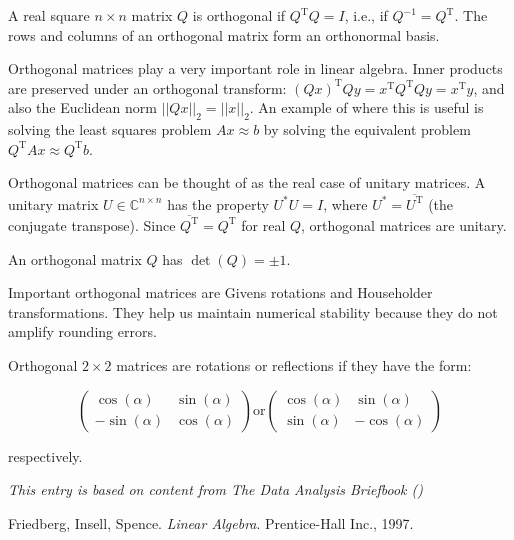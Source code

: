 \documentclass[12pt]{article}
\newcommand{\trT}{{\mathrm T}}
\begin{document}
A real square $n \times n$ matrix $Q$ is orthogonal if $Q^\trT Q = I$, i.e., if $Q^{-1} = Q^\trT$.  The rows and columns of an orthogonal matrix form an orthonormal basis.

Orthogonal matrices play a very important role in linear algebra.  Inner products are preserved under an orthogonal transform: $(Qx)^\trT Qy=x^\trT Q^\trT Qy=x^\trT y$, and also the Euclidean norm $||Qx||_2 = ||x||_2$.  An example of where this is useful is solving the least squares problem $Ax \approx b$ by solving the equivalent problem $Q^\trT Ax \approx Q^\trT b$.

Orthogonal matrices can be thought of as the real case of unitary matrices.  A unitary matrix $U \in \mathbb{C}^{n \times n}$ has the property $U^*U = I$, where $U^* = \overline{U^\trT}$ (the conjugate transpose).  Since $\overline{Q^\trT} = Q^\trT$ for real $Q$, orthogonal matrices are unitary.

An orthogonal matrix $Q$ has $\det(Q) = \pm 1$.

Important orthogonal matrices are Givens rotations and Householder transformations.  They help us maintain numerical stability because they do not amplify rounding errors.

Orthogonal $2 \times 2$ matrices are rotations or reflections if they have the form:

$$ \begin{pmatrix} \cos(\alpha) & \sin(\alpha) \\ -\sin(\alpha) & \cos(\alpha) \end{pmatrix}  \text{or} \begin{pmatrix} \cos(\alpha) & \sin(\alpha) \\ \sin(\alpha) & -\cos(\alpha) \end{pmatrix} $$

respectively.

{\it This entry is based on content from The Data Analysis Briefbook ()}
\begin{thebibliography}{3}

 Friedberg, Insell, Spence. {\it Linear Algebra}. Prentice-Hall Inc., 1997.

\end{thebibliography}


\end{document}
